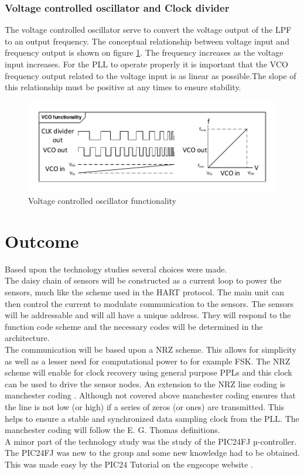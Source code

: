 \subsubsection{Voltage controlled oscillator and Clock divider}
The voltage controlled oscillator serve to convert the voltage output of the LPF to an output frequency. The conceptual relationship between voltage input and frequency output is shown on figure \ref{fig:VCO_func}. The frequency increases as the voltage input increases. For the PLL to operate properly it is important that the VCO frequency output related to the voltage input is as linear as possible.The slope of this relationship must be positive at any times to ensure stability.
\begin{figure}[H]
	\centering
	\includegraphics[width=1\textwidth]{billeder/10technologystudies/VCO_functionality}
	\caption{Voltage controlled oscillator functionality}
	\label{fig:VCO_func}
\end{figure}

\section{Outcome}
Based upon the technology studies several choices were made.\\
The daisy chain of sensors will be constructed as a current loop to power the sensors, much like the scheme used in the HART protocol. The main unit can then control the current to modulate communication to the sensors. The sensors will be addressable and will all have a unique address. They will respond to the function code scheme and the necessary codes will be determined in the architecture.\\
The communication will be based upon a NRZ scheme. This allows for simplicity as well as a lesser need for computational power to for example FSK. The NRZ scheme will enable for clock recovery using general purpose PPLs and this clock can be used to drive the sensor nodes. An extension to the NRZ line coding is manchester coding \cite{MC}. Although not covered above manchester coding ensures that the line is not low (or high) if a series of zeros (or ones) are transmitted. This helps to ensure a stable and synchronized data sampling clock from the PLL. The manchester coding will follow the E. G. Thomas definitions.\\
A minor part of the technology study was the study of the PIC24FJ µ-controller. The PIC24FJ was new to the group and some new knowledge had to be obtained. This was made easy by the PIC24 Tutorial on the engscope website \cite{Engscope}.



